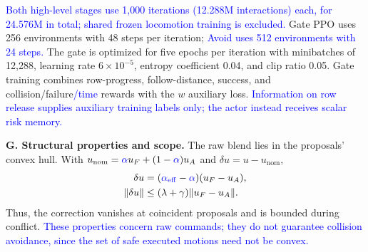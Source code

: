 \documentclass[letterpaper, 10 pt, conference]{ieeeconf}
\newcommand{\uF}{u_{F}}
\newcommand{\uA}{u_{A}}
\newcommand{\alphaeff}{\alpha_{\mathrm{eff}}}
\newcommand{\rev}[1]{\textcolor{blue}{#1}}
\begin{document}
\rev{Both high-level stages use 1,000 iterations (12.288M interactions) each, for 24.576M in total; shared frozen locomotion training is excluded.} Gate PPO uses 256 environments with 48 steps per iteration; \rev{Avoid uses 512 environments with 24 steps.} The gate is optimized for five epochs per iteration with minibatches of 12,288, learning rate $6{\times}10^{-5}$, entropy coefficient 0.04, and clip ratio 0.05. Gate training combines row-progress, follow-distance,
success, and collision/failure\rev{/time} rewards with the $w$ auxiliary loss.
\rev{Information on row release supplies auxiliary training labels only; the actor
instead receives scalar risk memory.}

\textbf{G. Structural properties and scope.}
The raw blend lies in the proposals' convex hull. With $u_{\mathrm{nom}}=\rev{\alpha}\uF+(1-\rev{\alpha})\uA$ and $\delta u=u-u_{\mathrm{nom}}$,
\begin{equation}
\begin{aligned}
\delta u &= (\rev{\alphaeff}-\rev{\alpha})(\uF-\uA),\\
\|\delta u\| &\le (\lambda+\gamma)\|\uF-\uA\|.
\end{aligned}
\label{eq:residual_bound}
\end{equation}
Thus, the correction vanishes at coincident proposals and is bounded during conflict. \rev{These properties concern raw commands; they do not guarantee collision avoidance, since the set of safe executed motions need not be convex.}
\end{document}
